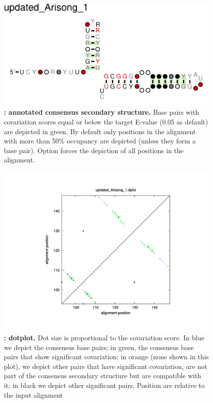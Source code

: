 \begin{figure}
  \includegraphics[scale=1.5]{Arisong_R2R.pdf} 
\caption{\small\textbf{:
    annotated consensus secondary structure.} Base pairs with
  covariation scores equal or below the target E-value (0.05 as
  default) are depicted in green. By default only positions in the
  alignment with more than 50\% occupancy are depicted (unless they form
  a base pair). Option  forces the depiction of all
  positions in the alignment.  }
\label{fig:r2r}
\end{figure}

\begin{figure}
  \includegraphics[scale=0.60]{Arisong_dplot.pdf}
\caption{\small\textbf{:
    dotplot.}  Dot size is proportional to the covariation score. In
  blue we depict the consensus base pairs; in green, the consensus
  base pairs that show significant covariation; in orange (none shown
  in this plot), we depict other pairs that have significant
  covariation, are not part of the consensus secondary structure but
  are compatible with it; in black we depict other significant pairs.
  Position are relative to the input alignment}
\label{fig:dplot}
\end{figure}



